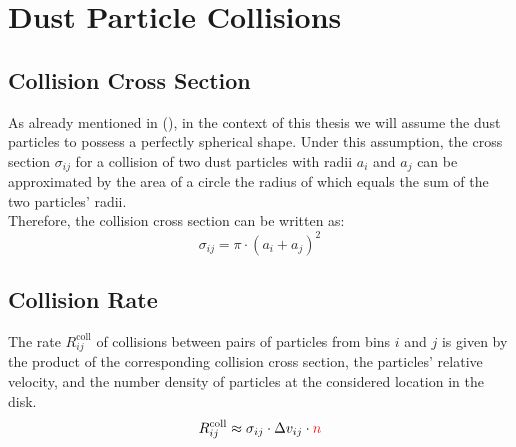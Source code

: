         


\clearpage\section{Dust Particle Collisions}

    \subsection{Collision Cross Section}
        
        As already mentioned in (), in the context of this thesis we will assume the
        dust particles to possess a perfectly spherical shape. Under this assumption, the cross
        section $\sigma_{ij}$ for a collision of two dust particles with radii $a_i$ and $a_j$ can
        be approximated by the area of a circle the radius of which equals the sum of the two
        particles' radii. \\

        Therefore, the collision cross section can be written as:
        \begin{equation}
            \sigma_{ij} = \pi \cdot (a_i+a_j)^2
        \end{equation}

    \subsection{Collision Rate}

        The rate $R^\text{coll}_{ij}$ of collisions between pairs of particles from bins $i$ 
        and $j$ is given by the product of the corresponding collision cross section, the
        particles' relative velocity, and the number density of particles at the considered 
        location in the disk. 
        \begin{equation}                                            %
            R^\text{coll}_{ij}
                \approx \sigma_{ij} \cdot \Delta v_{ij} \cdot \textcolor{red}{n}
        \end{equation}


        

